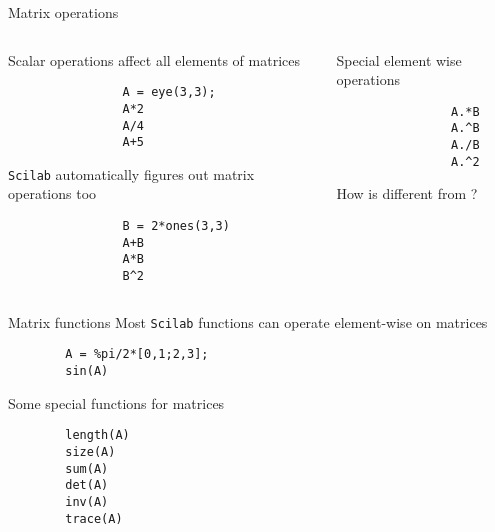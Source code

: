 \documentclass[%
    10pt,
    xcolor={dvipsnames},
    compress, %
]{beamer}
\newcommand{\scilab}{\texttt{Scilab}}
\begin{document}
\begin{frame}[fragile]{Matrix operations}
    \begin{columns}
        \begin{column}{0.49\linewidth}
            Scalar operations affect all elements of matrices
            \begin{lstlisting}
                A = eye(3,3);
                A*2
                A/4
                A+5
            \end{lstlisting}
            \scilab{} automatically figures out matrix operations too
            \begin{lstlisting}
                B = 2*ones(3,3)
                A+B
                A*B
                B^2
            \end{lstlisting}
        \end{column}
        \begin{column}{0.49\linewidth}
            Special element wise operations
            \begin{lstlisting}
                A.*B
                A.^B
                A./B
                A.^2
            \end{lstlisting}
            How is  different from ?
        \end{column}
    \end{columns}
\end{frame}

\begin{frame}[fragile]{Matrix functions}
    Most \scilab{} functions can operate element-wise on matrices
    \begin{lstlisting}
        A = %pi/2*[0,1;2,3];
        sin(A)
    \end{lstlisting}
    Some special functions for matrices
    \begin{lstlisting}
        length(A)
        size(A)
        sum(A)
        det(A)
        inv(A)
        trace(A)
    \end{lstlisting}
\end{frame}
\end{document}
